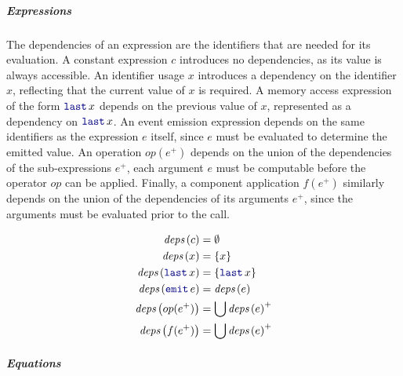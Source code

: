 \subparagraph{Expressions}

The dependencies of an expression are the identifiers that are needed for its evaluation.
%
A constant expression $c$ introduces no dependencies, as its value is always accessible.
%
An identifier usage $x$ introduces a dependency on the identifier $x$, reflecting that the current
value of $x$ is required.
%
A memory access expression of the form $\last{x}$ depends on the previous value of $x$,
represented as a dependency on $\last{x}$.
%
An event emission expression  depends on the same identifiers as the expression $e$
itself, since $e$ must be evaluated to determine the emitted value.
%
An operation $op(e^+)$ depends on the union of the dependencies of the sub-expressions
$e^+$, each argument $e$ must be computable before the operator $op$ can be applied.
%
Finally, a component application $f(e^+)$ similarly depends on the union of the dependencies
of its arguments $e^+$, since the arguments must be evaluated prior to the call.

\begin{align}
    \deps{c}        & = \emptyset \label{rule:semantics:grsync:causality:dependencies:deps:e:const}        \\
    \deps{x}        & = \{x\} \label{rule:semantics:grsync:causality:dependencies:deps:e:ident}            \\
    \deps{\last{x}} & = \{\last{x}\} \label{rule:semantics:grsync:causality:dependencies:deps:e:last}      \\
    \deps{\emit{e}} & = \deps{e} \label{rule:semantics:grsync:causality:dependencies:deps:e:emit}          \\
    \deps{op(e^+)}  & = \bigcup \deps{e}^+ \label{rule:semantics:grsync:causality:dependencies:deps:e:op}  \\
    \deps{f(e^+)}   & = \bigcup \deps{e}^+ \label{rule:semantics:grsync:causality:dependencies:deps:e:app}
\end{align}

\subparagraph{Equations}

